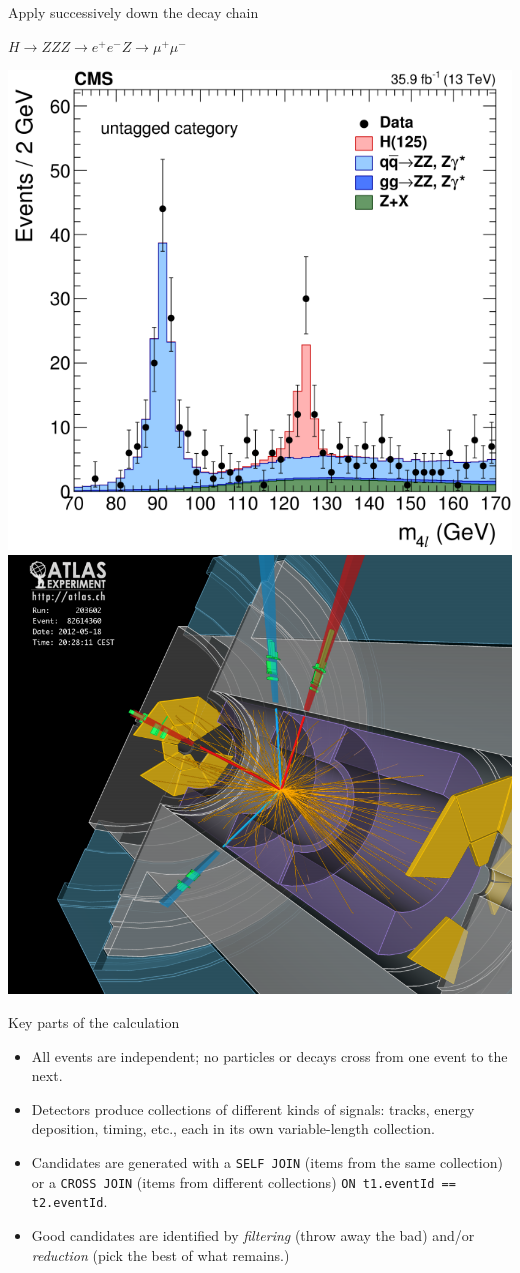 \documentclass[aspectratio=169]{beamer}
\begin{document}
\begin{frame}{Apply successively down the decay chain}
\Large
\begin{center}
$H \to ZZ$\hspace{1 cm}$Z \to e^+e^-$\hspace{1 cm}$Z \to \mu^+\mu^-$
\end{center}

\includegraphics[height=6 cm]{higgs-to-four-leptons.png}\hfill\includegraphics[height=6 cm]{higgs-to-four-leptons-2.png}
\end{frame}

\begin{frame}{Key parts of the calculation}
\Large
\vspace{0.15 cm}
\begin{itemize}\setlength{\itemsep}{0.25 cm}
\item All events are independent; no particles or decays cross from one event to the next.
\item Detectors produce collections of different kinds of signals: tracks, energy deposition, timing, etc., each in its own variable-length collection.
\item Candidates are generated with a \texttt{SELF JOIN} (items from the same collection) or a \texttt{CROSS JOIN} (items from different collections) \texttt{ON t1.eventId == t2.eventId}.
\item Good candidates are identified by {\it filtering} (throw away the bad) and/or {\it reduction} (pick the best of what remains.)
\end{itemize}
\end{frame}
\end{document}
